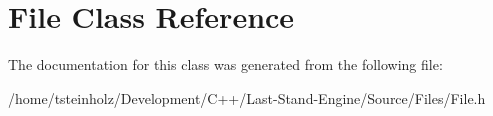 \hypertarget{classFile}{}\section{File Class Reference}
\label{classFile}


The documentation for this class was generated from the following file\+:\begin{DoxyCompactItemize}
\item 
/home/tsteinholz/\+Development/\+C++/\+Last-\/\+Stand-\/\+Engine/\+Source/\+Files/File.\+h\end{DoxyCompactItemize}
